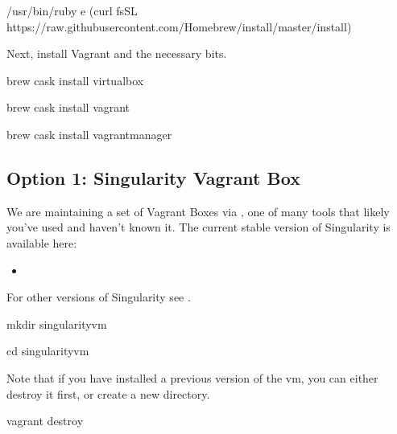 \documentclass[letterpaper,10pt,english]{sphinxmanual}
\begin{document}
%
\begin{sphinxVerbatim}[commandchars=\\\{\}]
/usr/bin/ruby \PYGZhy{}e \PYGZdq{}\PYGZdl{}(curl \PYGZhy{}fsSL https://raw.githubusercontent.com/Homebrew/install/master/install)\PYGZdq{}
\end{sphinxVerbatim}

Next, install Vagrant and the necessary bits.

%
\begin{sphinxVerbatim}[commandchars=\\\{\}]
brew cask install virtualbox

brew cask install vagrant

brew cask install vagrant\PYGZhy{}manager
\end{sphinxVerbatim}


\subsection{Option 1: Singularity Vagrant Box}
\label{\detokenize{installation:option-1-singularity-vagrant-box}}
We are maintaining a set of Vagrant Boxes via , one of  many tools that likely you’ve used and haven’t known it. The current stable version of Singularity is available here:
\begin{itemize}
\item {} 

\end{itemize}

For other versions of Singularity see .

%
\begin{sphinxVerbatim}[commandchars=\\\{\}]
mkdir singularity\PYGZhy{}vm

cd singularity\PYGZhy{}vm
\end{sphinxVerbatim}

Note that if you have installed a previous version of the vm, you can either destroy it first, or create a new directory.

%
\begin{sphinxVerbatim}[commandchars=\\\{\}]
vagrant destroy
\end{sphinxVerbatim}
\end{document}
